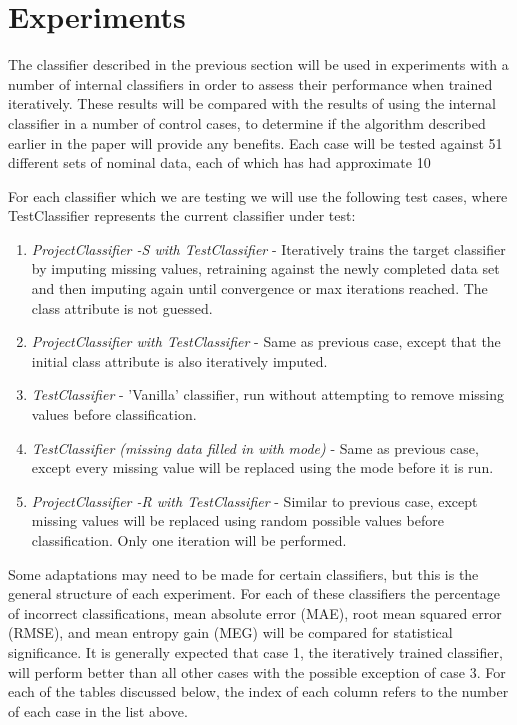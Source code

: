 \newpage
\chapter{Experiments}
The classifier described in the previous section will be used in experiments with a number of internal classifiers in order to assess their performance when trained iteratively. These results will be compared with the results of using the internal classifier in a number of control cases, to determine if the algorithm described earlier in the paper will provide any benefits. Each case will be tested against 51 different sets of nominal data, each of which has had approximate 10%

For each classifier which we are testing we will use the following test cases, where TestClassifier represents the current classifier under test:

\begin{enumerate}
\item \textit{ProjectClassifier -S with TestClassifier} - Iteratively trains the target classifier by imputing missing values, retraining against the newly completed data set and then imputing again until convergence or max iterations reached. The class attribute is not guessed.
\item \textit{ProjectClassifier with TestClassifier} - Same as previous case, except that the initial class attribute is also iteratively imputed.
\item \textit{TestClassifier} - 'Vanilla' classifier, run without attempting to remove missing values before classification.
\item \textit{TestClassifier (missing data filled in with mode)} - Same as previous case, except every missing value will be replaced using the mode before it is run.
\item \textit{ProjectClassifier -R with TestClassifier} - Similar to previous case, except missing values will be replaced using random possible values before classification. Only one iteration will be performed.
\end{enumerate}

Some adaptations may need to be made for certain classifiers, but this is the general structure of each experiment. For each of these classifiers the percentage of incorrect classifications, mean absolute error (MAE), root mean squared error (RMSE), and mean entropy gain (MEG) will be compared for statistical significance. It is generally expected that case 1, the iteratively trained classifier, will perform better than all other cases with the possible exception of case 3. For each of the tables discussed below, the index of each column refers to the number of each case in the list above.

